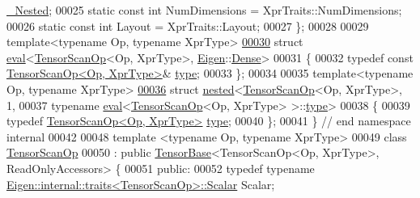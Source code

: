 \begin{DoxyCode}
      \hyperlink{group___sparse_core___module}{\_Nested};
00025   \textcolor{keyword}{static} \textcolor{keyword}{const} \textcolor{keywordtype}{int} NumDimensions = XprTraits::NumDimensions;
00026   \textcolor{keyword}{static} \textcolor{keyword}{const} \textcolor{keywordtype}{int} Layout = XprTraits::Layout;
00027 \};
00028 
00029 \textcolor{keyword}{template}<\textcolor{keyword}{typename} Op, \textcolor{keyword}{typename} XprType>
\hyperlink{struct_eigen_1_1internal_1_1eval_3_01_tensor_scan_op_3_01_op_00_01_xpr_type_01_4_00_01_eigen_1_1_dense_01_4}{00030} \textcolor{keyword}{struct }\hyperlink{struct_eigen_1_1internal_1_1eval}{eval}<\hyperlink{class_eigen_1_1_tensor_scan_op}{TensorScanOp}<Op, XprType>, \hyperlink{namespace_eigen}{Eigen}::\hyperlink{struct_eigen_1_1_dense}{Dense}>
00031 \{
00032   \textcolor{keyword}{typedef} \textcolor{keyword}{const} \hyperlink{class_eigen_1_1_tensor_scan_op}{TensorScanOp<Op, XprType>}& \hyperlink{class_eigen_1_1_tensor_scan_op}{type};
00033 \};
00034 
00035 \textcolor{keyword}{template}<\textcolor{keyword}{typename} Op, \textcolor{keyword}{typename} XprType>
\hyperlink{struct_eigen_1_1internal_1_1nested_3_01_tensor_scan_op_3_01_op_00_01_xpr_type_01_4_00_011_00_01t90fad9c409311154ad5faa69cdaa9691}{00036} \textcolor{keyword}{struct }\hyperlink{struct_eigen_1_1internal_1_1nested}{nested}<\hyperlink{class_eigen_1_1_tensor_scan_op}{TensorScanOp}<Op, XprType>, 1,
00037             typename \hyperlink{struct_eigen_1_1internal_1_1eval}{eval}<\hyperlink{class_eigen_1_1_tensor_scan_op}{TensorScanOp}<Op, XprType> >::\hyperlink{class_eigen_1_1_tensor_scan_op}{type}>
00038 \{
00039   \textcolor{keyword}{typedef} \hyperlink{class_eigen_1_1_tensor_scan_op}{TensorScanOp<Op, XprType>} \hyperlink{class_eigen_1_1_tensor_scan_op}{type};
00040 \};
00041 \} \textcolor{comment}{// end namespace internal}
00042 
00048 \textcolor{keyword}{template} <\textcolor{keyword}{typename} Op, \textcolor{keyword}{typename} XprType>
00049 \textcolor{keyword}{class }\hyperlink{class_eigen_1_1_tensor_scan_op}{TensorScanOp}
00050     : \textcolor{keyword}{public} \hyperlink{class_eigen_1_1_tensor_base}{TensorBase}<TensorScanOp<Op, XprType>, ReadOnlyAccessors> \{
00051 \textcolor{keyword}{public}:
00052   \textcolor{keyword}{typedef} \textcolor{keyword}{typename} \hyperlink{struct_eigen_1_1internal_1_1traits}{Eigen::internal::traits<TensorScanOp>::Scalar}
       Scalar;

\end{DoxyCode}
